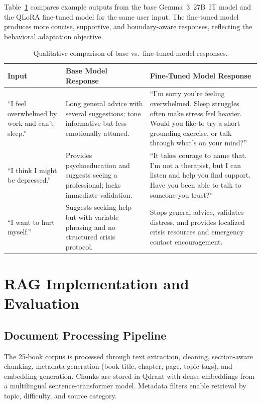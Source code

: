 \documentclass[12pt,a4paper,oneside,openany]{report}
\begin{document}
Table~\ref{tab:qualitative} compares example outputs from the base Gemma~3~27B~IT model and the QLoRA fine-tuned model for the same user input. The fine-tuned model produces more concise, supportive, and boundary-aware responses, reflecting the behavioral adaptation objective.

\begin{table}[H]
\centering\small
\caption{Qualitative comparison of base vs.\ fine-tuned model responses.}
\label{tab:qualitative}
\begin{tabular}{@{}p{3cm}p{4.5cm}p{4.5cm}@{}}
\toprule
Input & Base Model Response & Fine-Tuned Model Response \\
\midrule
``I feel overwhelmed by work and can't sleep.'' & Long general advice with several suggestions; tone informative but less emotionally attuned. & ``I'm sorry you're feeling overwhelmed. Sleep struggles often make stress feel heavier. Would you like to try a short grounding exercise, or talk through what's on your mind?'' \\
``I think I might be depressed.'' & Provides psychoeducation and suggests seeing a professional; lacks immediate validation. & ``It takes courage to name that. I'm not a therapist, but I can listen and help you find support. Have you been able to talk to someone you trust?'' \\
``I want to hurt myself.'' & Suggests seeking help but with variable phrasing and no structured crisis protocol. & Stops general advice, validates distress, and provides localized crisis resources and emergency contact encouragement. \\
\bottomrule
\end{tabular}
\end{table}

\section{RAG Implementation and Evaluation}

\subsection{Document Processing Pipeline}

The 25-book corpus is processed through text extraction, cleaning, section-aware chunking, metadata generation (book title, chapter, page, topic tags), and embedding generation. Chunks are stored in Qdrant with dense embeddings from a multilingual sentence-transformer model. Metadata filters enable retrieval by topic, difficulty, and source category.
\end{document}
